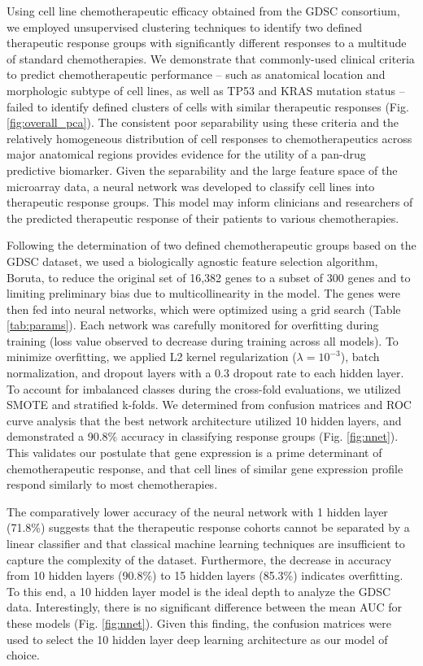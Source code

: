 \documentclass[10pt, letterpaper, twocolumn]{article}
\begin{document}
Using cell line chemotherapeutic efficacy obtained from the GDSC consortium, we employed unsupervised clustering techniques to identify two defined therapeutic response groups with significantly different responses to a multitude of standard chemotherapies. We demonstrate that commonly-used clinical criteria to predict chemotherapeutic performance -- such as anatomical location and morphologic subtype of cell lines, as well as TP53 and KRAS mutation status -- failed to identify defined clusters of cells with similar therapeutic responses (Fig. \ref{fig:overall_pca}). The consistent poor separability using these criteria and the relatively homogeneous distribution of cell responses to chemotherapeutics across major anatomical regions provides evidence for the utility of a pan-drug predictive biomarker. Given the separability and the large feature space of the microarray data, a neural network was developed to classify cell lines into therapeutic response groups. This model may inform clinicians and researchers of the predicted therapeutic response of their patients to various chemotherapies.

Following the determination of two defined chemotherapeutic groups based on the GDSC dataset, we used a biologically agnostic feature selection algorithm, Boruta, to reduce the original set of 16,382 genes to a subset of 300 genes and to limiting preliminary bias due to multicollinearity in the model. The genes were then fed into neural networks, which were optimized using a grid search (Table \ref{tab:params}). Each network was carefully monitored for overfitting during training (loss value observed to decrease during training across all models). To minimize overfitting, we applied L2 kernel regularization ($\lambda=10^{-3}$), batch normalization, and dropout layers with a 0.3 dropout rate to each hidden layer. To account for imbalanced classes during the cross-fold evaluations, we utilized SMOTE and stratified k-folds. We determined from confusion matrices and ROC curve analysis that the best network architecture utilized 10 hidden layers, and demonstrated a 90.8\% accuracy in classifying response groups (Fig. \ref{fig:nnet}). This validates our postulate that gene expression is a prime determinant of chemotherapeutic response, and that cell lines of similar gene expression profile respond similarly to most chemotherapies.

The comparatively lower accuracy of the neural network with 1 hidden layer (71.8\%) suggests that the therapeutic response cohorts cannot be separated by a linear classifier and that classical machine learning techniques are insufficient to capture the complexity of the dataset. Furthermore, the decrease in accuracy from 10 hidden layers (90.8\%) to 15 hidden layers (85.3\%) indicates overfitting. To this end, a 10 hidden layer model is the ideal depth to analyze the GDSC data. Interestingly, there is no significant difference between the mean AUC for these models (Fig. \ref{fig:nnet}). Given this finding, the confusion matrices were used to select the 10 hidden layer deep learning architecture as our model of choice.
\end{document}
